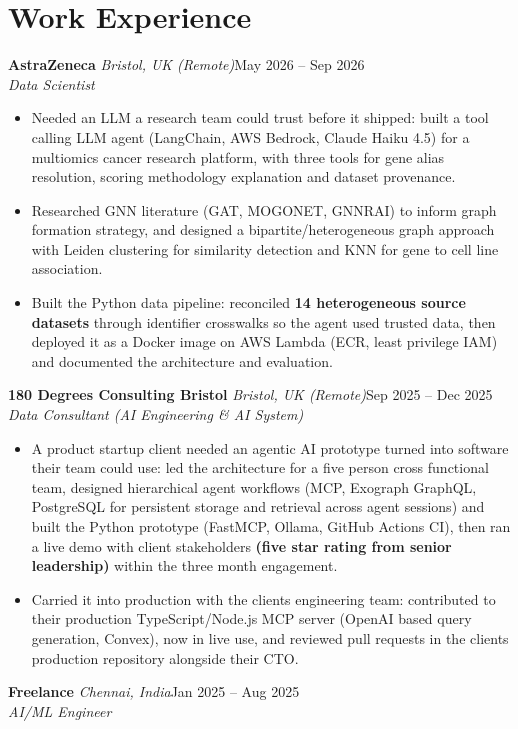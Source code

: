 \documentclass[a4paper,11pt]{article}
\newcommand{\role}[4]{%
  \textbf{#1}{\color{muted}\,\textperiodcentered\,\textit{#2}}\hfill{\color{muted}#3}\\
  \textit{#4}\par}
\newcommand{\gap}{\vspace{5pt}}
\newcommand{\num}[1]{\textbf{#1}}   %
\begin{document}
\section{Work Experience}
\role{AstraZeneca}{Bristol, UK (Remote)}{May 2026 – Sep 2026}{Data Scientist}
\begin{itemize}
  \item Needed an LLM a research team could trust before it shipped: built a tool calling LLM agent (LangChain, AWS Bedrock, Claude Haiku 4.5) for a multiomics cancer research platform, with three tools for gene alias resolution, scoring methodology explanation and dataset provenance.
  \item Researched GNN literature (GAT, MOGONET, GNNRAI) to inform graph formation strategy, and designed a bipartite/heterogeneous graph approach with Leiden clustering for similarity detection and KNN for gene to cell line association.
  \item Built the Python data pipeline: reconciled \num{14 heterogeneous source datasets} through identifier crosswalks so the agent used trusted data, then deployed it as a Docker image on AWS Lambda (ECR, least privilege IAM) and documented the architecture and evaluation.
\end{itemize}
\gap
{}
\role{180 Degrees Consulting Bristol}{Bristol, UK (Remote)}{Sep 2025 – Dec 2025}{Data Consultant (AI Engineering \& AI System)}
\begin{itemize}
  \item A product startup client needed an agentic AI prototype turned into software their team could use: led the architecture for a five person cross functional team, designed hierarchical agent workflows (MCP, Exograph GraphQL, PostgreSQL for persistent storage and retrieval across agent sessions) and built the Python prototype (FastMCP, Ollama, GitHub Actions CI), then ran a live demo with client stakeholders \num{(five star rating from senior leadership)} within the three month engagement.
  \item Carried it into production with the client\textquotesingle{}s engineering team: contributed to their production TypeScript/Node.js MCP server (OpenAI based query generation, Convex), now in live use, and reviewed pull requests in the client\textquotesingle{}s production repository alongside their CTO.
\end{itemize}
\gap
{}
\role{Freelance}{Chennai, India}{Jan 2025 – Aug 2025}{AI/ML Engineer}
\end{document}
